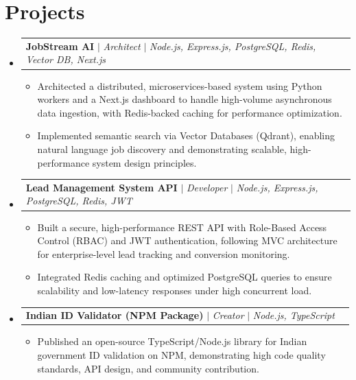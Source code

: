 \documentclass[letterpaper,11pt]{article}
\makeatletter
\newcommand{\resumeItem}[1]{
  \item\small{
    {#1 \vspace{-2pt}}
  }
}
\newcommand{\resumeProjectHeading}[2]{
    \item
    \begin{tabular*}{0.97\textwidth}{l@{\extracolsep{\fill}}r}
      \small#1 & #2 \\
    \end{tabular*}\vspace{-7pt}
}
\newcommand{\resumeSubHeadingListStart}{\begin{itemize}[leftmargin=0.15in, label={}]}
\newcommand{\resumeSubHeadingListEnd}{\end{itemize}}
\newcommand{\resumeItemListStart}{\begin{itemize}}
\newcommand{\resumeItemListEnd}{\end{itemize}\vspace{-5pt}}
\makeatother
\begin{document}
\section{Projects}
    \resumeSubHeadingListStart

      \resumeProjectHeading
          {\textbf{JobStream AI} $|$ \emph{Architect} $|$ \emph{Node.js, Express.js, PostgreSQL, Redis, Vector DB, Next.js}}{}
          \resumeItemListStart
            \resumeItem{Architected a distributed, microservices-based system using Python workers and a Next.js dashboard to handle high-volume asynchronous data ingestion, with Redis-backed caching for performance optimization.}
            \resumeItem{Implemented semantic search via Vector Databases (Qdrant), enabling natural language job discovery and demonstrating scalable, high-performance system design principles.}
          \resumeItemListEnd

      \resumeProjectHeading
          {\textbf{Lead Management System API} $|$ \emph{Developer} $|$ \emph{Node.js, Express.js, PostgreSQL, Redis, JWT}}{}
          \resumeItemListStart
            \resumeItem{Built a secure, high-performance REST API with Role-Based Access Control (RBAC) and JWT authentication, following MVC architecture for enterprise-level lead tracking and conversion monitoring.}
            \resumeItem{Integrated Redis caching and optimized PostgreSQL queries to ensure scalability and low-latency responses under high concurrent load.}
          \resumeItemListEnd

      \resumeProjectHeading
          {\textbf{Indian ID Validator (NPM Package)} $|$ \emph{Creator} $|$ \emph{Node.js, TypeScript}}{}
          \resumeItemListStart
            \resumeItem{Published an open-source TypeScript/Node.js library for Indian government ID validation on NPM, demonstrating high code quality standards, API design, and community contribution.}
          \resumeItemListEnd

    \resumeSubHeadingListEnd

\end{document}
